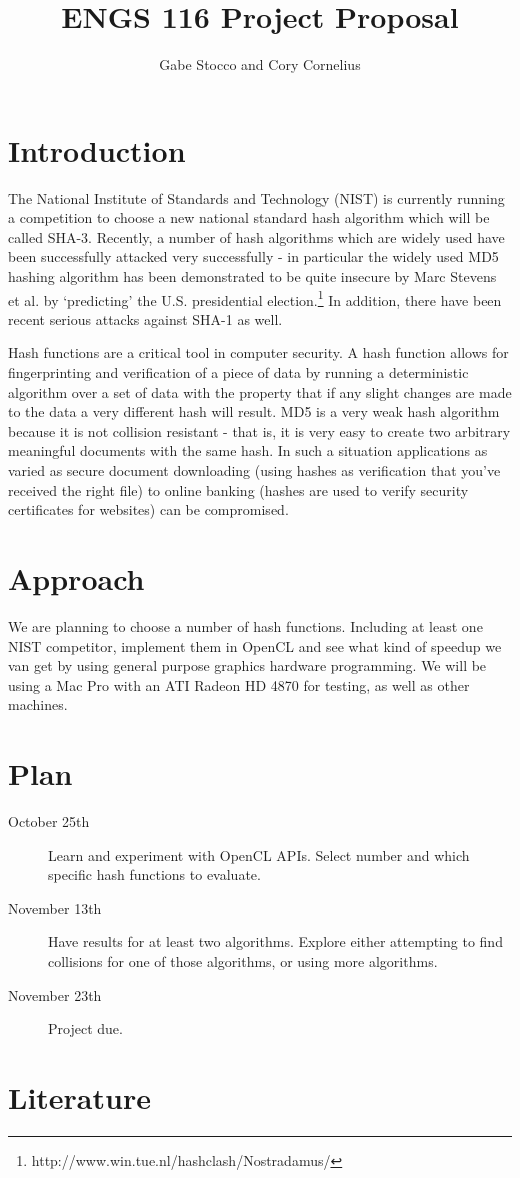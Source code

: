 \documentclass{article}
\title{ENGS 116 Project Proposal}
\author{Gabe Stocco and Cory Cornelius}
\begin{document}
\maketitle

\section{Introduction}
The National Institute of Standards and Technology (NIST) is currently running a competition to choose a new national standard hash algorithm which will be called SHA-3.
Recently, a number of hash algorithms which are widely used have been successfully attacked very successfully - in particular the widely used MD5 hashing algorithm has been demonstrated to be quite insecure by Marc Stevens et al. by `predicting' the U.S. presidential election.\footnote{http://www.win.tue.nl/hashclash/Nostradamus/}
In addition, there have been recent serious attacks against SHA-1 as well.

Hash functions are a critical tool in computer security.
A hash function allows for fingerprinting and verification of a piece of data by running a deterministic algorithm over a set of data with the property that if any slight changes are made to the data a very different hash will result.
MD5 is a very weak hash algorithm because it is not collision resistant - that is, it is very easy to create two arbitrary meaningful documents with the same hash.
In such a situation applications as varied as secure document downloading (using hashes as verification that you've received the right file) to online banking (hashes are used to verify security certificates for websites) can be compromised.


\section{Approach}
We are planning to choose a number of hash functions.
Including at least one NIST competitor, implement them in OpenCL and see what kind of speedup we van get by using general purpose graphics hardware programming.
We will be using a Mac Pro with an ATI Radeon HD 4870 for testing, as well as other machines.


\section{Plan}
\begin{description}
  \item[October 25th] Learn and experiment with OpenCL APIs. Select number and which specific hash functions to evaluate.
  \item[November 13th] Have results for at least two algorithms. Explore either attempting to find collisions for one of those algorithms, or using more algorithms.
  \item[November 23th] Project due.
\end{description}


\section{Literature}
\end{document}
